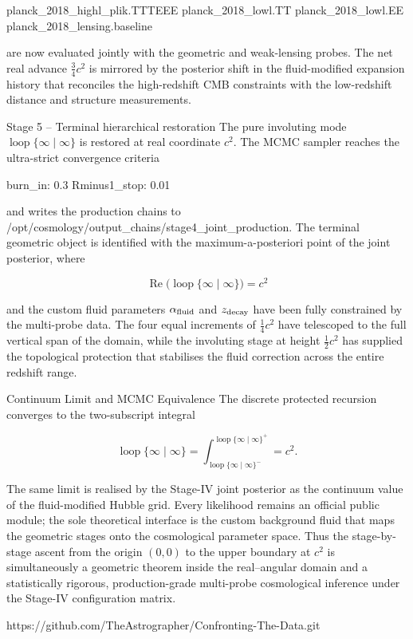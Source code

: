 planck_2018_highl_plik.TTTEEE
planck_2018_lowl.TT
planck_2018_lowl.EE
planck_2018_lensing.baseline

are now evaluated jointly with the geometric and weak-lensing probes. The net real advance \(\frac34 c^2\) is mirrored by the posterior shift in the fluid-modified expansion history that reconciles the high-redshift CMB constraints with the low-redshift distance and structure measurements.

Stage 5 – Terminal hierarchical restoration
The pure involuting mode \(\operatorname{loop}\{\infty\mid\infty\}\) is restored at real coordinate \(c^2\).  
The MCMC sampler reaches the ultra-strict convergence criteria

burn_in: 0.3
Rminus1_stop: 0.01

and writes the production chains to /opt/cosmology/output_chains/stage4_joint_production. The terminal geometric object is identified with the maximum-a-posteriori point of the joint posterior, where

\[
\operatorname{Re}\bigl(\operatorname{loop}\{\infty\mid\infty\}\bigr)=c^2
\]

and the custom fluid parameters \(\alpha_{\rm fluid}\) and \(z_{\rm decay}\) have been fully constrained by the multi-probe data. The four equal increments of \(\frac14 c^2\) have telescoped to the full vertical span of the domain, while the involuting stage at height \(\frac12 c^2\) has supplied the topological protection that stabilises the fluid correction across the entire redshift range.

Continuum Limit and MCMC Equivalence
The discrete protected recursion converges to the two-subscript integral

\[
\operatorname{loop}\{\infty\mid\infty\}
=\int_{\operatorname{loop}\{\infty\mid\infty\}^{-}}^{\operatorname{loop}\{\infty\mid\infty\}^{+}}=c^2.
\]

The same limit is realised by the Stage-IV joint posterior as the continuum value of the fluid-modified Hubble grid. Every likelihood remains an official public module; the sole theoretical interface is the custom background fluid that maps the geometric stages onto the cosmological parameter space. Thus the stage-by-stage ascent from the origin \((0,0)\) to the upper boundary at \(c^2\) is simultaneously a geometric theorem inside the real–angular domain and a statistically rigorous, production-grade multi-probe cosmological inference under the Stage-IV configuration matrix.

https://github.com/TheAstrographer/Confronting-The-Data.git

